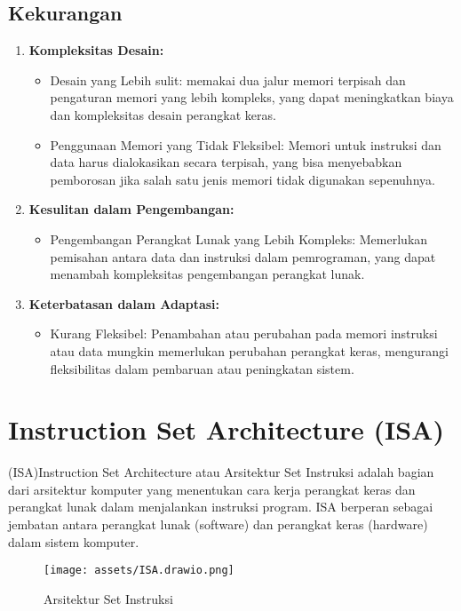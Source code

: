 \documentclass{article}
\begin{document}
\subsection{Kekurangan}

\begin{enumerate}[label=\arabic*.]
  \item \textbf{Kompleksitas Desain:}
  \begin{itemize}
    \item Desain yang Lebih sulit: memakai dua jalur memori terpisah dan pengaturan memori yang lebih kompleks, yang dapat meningkatkan biaya dan kompleksitas desain perangkat keras.
    \item Penggunaan Memori yang Tidak Fleksibel: Memori untuk instruksi dan data harus dialokasikan secara terpisah, yang bisa menyebabkan pemborosan jika salah satu jenis memori tidak digunakan sepenuhnya.
  \end{itemize}
  
  \item \textbf{Kesulitan dalam Pengembangan:}
  \begin{itemize}
    \item Pengembangan Perangkat Lunak yang Lebih Kompleks: Memerlukan pemisahan antara data dan instruksi dalam pemrograman, yang dapat menambah kompleksitas pengembangan perangkat lunak.
  \end{itemize}
  
  \item \textbf{Keterbatasan dalam Adaptasi:}
  \begin{itemize}
    \item Kurang Fleksibel: Penambahan atau perubahan pada memori instruksi atau data mungkin memerlukan perubahan perangkat keras, mengurangi fleksibilitas dalam pembaruan atau peningkatan sistem.
  \end{itemize}
\end{enumerate}

\section{Instruction Set Architecture (ISA)}
(ISA)Instruction Set Architecture atau Arsitektur Set Instruksi adalah bagian dari arsitektur komputer yang menentukan cara kerja perangkat keras dan perangkat lunak dalam menjalankan instruksi program. ISA berperan sebagai jembatan antara perangkat lunak (software) dan perangkat keras (hardware) dalam sistem komputer.
\begin{figure}
    \centering
    \texttt{[image: assets/ISA.drawio.png]}
    \caption{Arsitektur Set Instruksi}
    \label{fig:enter-label}
\end{figure}
\end{document}
